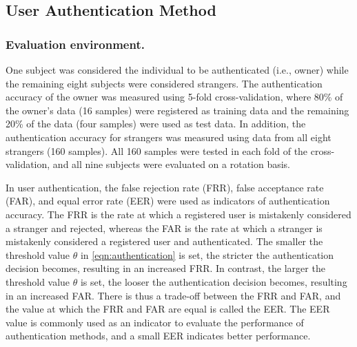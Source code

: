 \documentclass[sigchi,authordraft]{acmart}
\begin{document}



\subsection{User Authentication Method}
\subsubsection{Evaluation environment.}
One subject was considered the individual to be authenticated (i.e., owner) while the remaining eight subjects were considered strangers. The authentication accuracy of the owner was measured using 5-fold cross-validation, where 80\% of the owner's data (16 samples) were registered as training data and the remaining 20\% of the data (four samples) were used as test data. In addition, the authentication accuracy for strangers was measured using data from all eight strangers (160 samples). All 160 samples were tested in each fold of the cross-validation, and all nine subjects were evaluated on a rotation basis.\par

In user authentication, the false rejection rate (FRR), false acceptance rate (FAR), and equal error rate (EER) were used as indicators of authentication accuracy. The FRR is the rate at which a registered user is mistakenly considered a stranger and rejected, whereas the FAR is the rate at which a stranger is mistakenly considered a registered user and authenticated. The smaller the threshold value $\theta$ in \ref{eqn:authentication} is set, the stricter the authentication decision becomes, resulting in an increased FRR. In contrast, the larger the threshold value $\theta$ is set, the looser the authentication decision becomes, resulting in an increased FAR. There is thus a trade-off between the FRR and FAR, and the value at which the FRR and FAR are equal is called the EER. The EER value is commonly used as an indicator to evaluate the performance of authentication methods, and a small EER indicates better performance.
\end{document}
